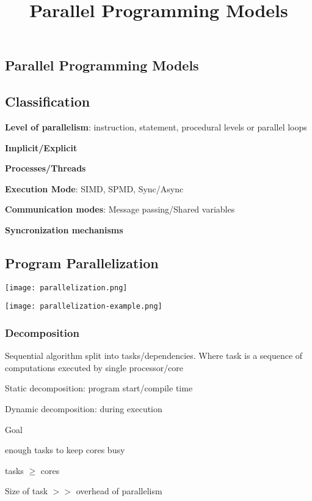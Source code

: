 \documentclass[12pt]{article}
\title{\textbf{Parallel Programming Models}}
\date{}
\begin{document}
\maketitle

\begin{spacing}{1.5}

\section{Parallel Programming Models}

\subsection{Classification}

\begin{itemize*}
	\item \textbf{Level of parallelism}: instruction, statement, procedural levels or parallel loops
	\item \textbf{Implicit/Explicit}
	\item \textbf{Processes/Threads}
	\item \textbf{Execution Mode}: SIMD, SPMD, Sync/Async
	\item \textbf{Communication modes}: Message passing/Shared variables
	\item \textbf{Syncronization mechanisms}
\end{itemize*}

\subsection{Program Parallelization}

\texttt{[image: parallelization.png]}

\texttt{[image: parallelization-example.png]}

\subsubsection{Decomposition}

\begin{itemize*}
	\item Sequential algorithm split into tasks/dependencies. Where task is a sequence of computations executed by single processor/core
	\item Static decomposition: program start/compile time
	\item Dynamic decomposition: during execution
	\item Goal
		\begin{itemize*}
			\item enough tasks to keep cores busy
			\item tasks $\ge$ cores
			\item Size of task $>>$ overhead of parallelism
		\end{itemize*}
\end{itemize*}


\end{spacing}
\end{document}
